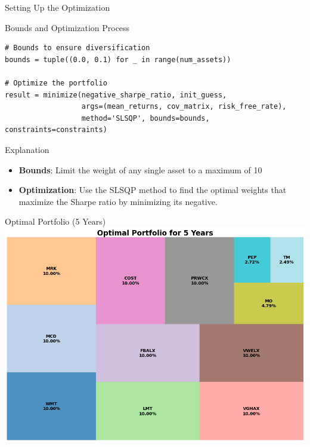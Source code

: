 \documentclass{beamer}
\begin{document}
\begin{frame}[fragile]{Setting Up the Optimization}
    \begin{block}{Bounds and Optimization Process}
        \scriptsize
        \begin{verbatim}
# Bounds to ensure diversification
bounds = tuple((0.0, 0.1) for _ in range(num_assets))

# Optimize the portfolio
result = minimize(negative_sharpe_ratio, init_guess, 
                  args=(mean_returns, cov_matrix, risk_free_rate), 
                  method='SLSQP', bounds=bounds, constraints=constraints)
        \end{verbatim}
    \end{block}
    \begin{block}{Explanation}
        \scriptsize
        \begin{itemize}
            \item \textbf{Bounds}: Limit the weight of any single asset to a maximum of 10%
            \item \textbf{Optimization}: Use the SLSQP method to find the optimal weights that maximize the Sharpe ratio by minimizing its negative.
        \end{itemize}
    \end{block}
\end{frame}

\begin{frame}{Optimal Portfolio (5 Years)}
    \centering
    \includegraphics[height=0.8\textheight]{optimal_portfolio_5_years.png}
\end{frame}
\end{document}
